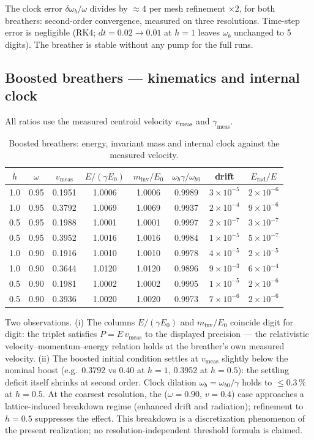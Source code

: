\documentclass[11pt,a4paper]{article}
\theoremstyle{plain}
\theoremstyle{remark}
\begin{document}
The clock error $\delta\omega_b/\omega$ divides by $\approx 4$ per mesh refinement $\times 2$, for both breathers: second-order convergence, measured on three resolutions. Time-step error is negligible (RK4; $dt = 0.02 \to 0.01$ at $h = 1$ leaves $\omega_b$ unchanged to 5 digits). The breather is stable without any pump for the full runs.

\subsection{Boosted breathers --- kinematics and internal clock}
All ratios use the measured centroid velocity $v_{\text{meas}}$ and $\gamma_{\text{meas}}$.

\begin{table}[htbp]
\centering\small
\begin{tabular}{cccccccc}
\toprule
$h$ & $\omega$ & $v_{\text{meas}}$ & $E/(\gamma E_0)$ & $m_{\text{inv}}/E_0$ & $\omega_b\gamma/\omega_{b0}$ & drift & $E_{\text{rad}}/E$ \\
\midrule
1.0 & 0.95 & 0.1951 & 1.0006 & 1.0006 & 0.9989 & $3\times10^{-5}$ & $2\times10^{-6}$ \\
1.0 & 0.95 & 0.3792 & 1.0069 & 1.0069 & 0.9937 & $2\times10^{-4}$ & $9\times10^{-6}$ \\
0.5 & 0.95 & 0.1988 & 1.0001 & 1.0001 & 0.9997 & $2\times10^{-7}$ & $3\times10^{-7}$ \\
0.5 & 0.95 & 0.3952 & 1.0016 & 1.0016 & 0.9984 & $1\times10^{-5}$ & $5\times10^{-7}$ \\
1.0 & 0.90 & 0.1916 & 1.0010 & 1.0010 & 0.9978 & $4\times10^{-5}$ & $2\times10^{-5}$ \\
1.0 & 0.90 & 0.3644 & 1.0120 & 1.0120 & 0.9896 & $9\times10^{-3}$ & $6\times10^{-4}$ \\
0.5 & 0.90 & 0.1981 & 1.0002 & 1.0002 & 0.9995 & $1\times10^{-5}$ & $2\times10^{-6}$ \\
0.5 & 0.90 & 0.3936 & 1.0020 & 1.0020 & 0.9973 & $7\times10^{-6}$ & $2\times10^{-6}$ \\
\bottomrule
\end{tabular}
\caption{Boosted breathers: energy, invariant mass and internal clock against the measured velocity.}
\label{tab:breather_boost}
\end{table}

Two observations. (i) The columns $E/(\gamma E_0)$ and $m_{\text{inv}}/E_0$ coincide digit for digit: the triplet satisfies $P = E\,v_{\text{meas}}$ to the displayed precision --- the relativistic velocity--momentum--energy relation holds at the breather's own measured velocity. (ii) The boosted initial condition settles at $v_{\text{meas}}$ slightly below the nominal boost (e.g.\ 0.3792 vs 0.40 at $h=1$, 0.3952 at $h=0.5$): the settling deficit itself shrinks at second order. Clock dilation $\omega_b = \omega_{b0}/\gamma$ holds to $\le 0.3\,\%$ at $h = 0.5$. At the coarsest resolution, the ($\omega = 0.90$, $v = 0.4$) case approaches a lattice-induced breakdown regime (enhanced drift and radiation); refinement to $h = 0.5$ suppresses the effect. This breakdown is a discretization phenomenon of the present realization; no resolution-independent threshold formula is claimed.
\end{document}

